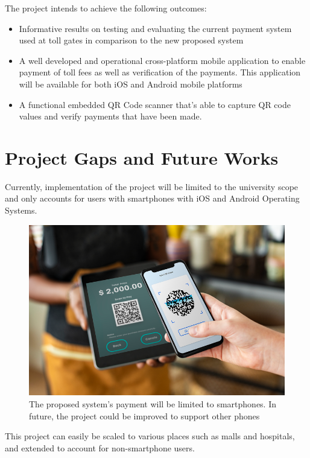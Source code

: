 The project intends to achieve the following outcomes:
\begin{itemize}
    \item Informative results on testing and evaluating the current payment system used at toll gates in comparison to the new proposed system
    \item A well developed and operational cross-platform mobile application to enable payment of toll fees as well as verification of the payments. This application will be available for both iOS and Android mobile platforms
    \item A functional embedded QR Code scanner that's able to capture QR code values and verify payments that have been made.

\end{itemize}


\section{Project Gaps and Future Works}
Currently, implementation of the project will be limited to the university scope and only accounts for users with smartphones with iOS and Android Operating Systems.

\begin{figure}
    \begin{center}
        \includegraphics[scale = 0.6]{images/qr}
        \caption{The proposed system's payment will be limited to smartphones. In future, the project could be improved to support other phones}
    \end{center}
\end{figure}
This project can easily be scaled to various places such as malls and hospitals, and extended to account for non-smartphone users.


